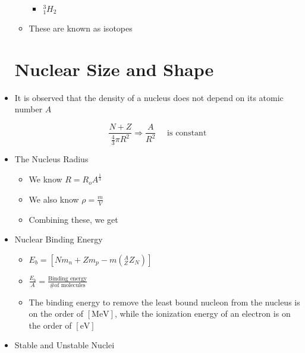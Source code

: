 \begin{itemize}
\begin{itemize}
\begin{itemize}
          \item $^3_1H_2$

        \end{itemize}

      \item These are known as isotopes

    \end{itemize}

    \section{Nuclear Size and Shape}

  \item It is observed that the density of a nucleus does not depend on its atomic number $A$

    $$\dfrac{N+Z}{\frac{4}{3}\pi R^2}\Rightarrow \frac{A}{R^2}\quad\text{ is constant}$$

  \item The Nucleus Radius

    \begin{itemize}

      \item We know $R=R_oA^{\frac{1}{3}}$

      \item We also know $\rho=\frac{m}{V}$

      \item Combining these, we get

    \end{itemize}

  \item Nuclear Binding Energy

    \begin{itemize}

      \item $E_{b}=\left[ Nm_n+Zm_p-m\left( ^A_ZZ_N \right) \right]$

      \item $\frac{E_b}{A}=\frac{\text{Binding energy}}{\text{\# of molecules}}$

      \item The binding energy to remove the least bound nucleon from the nucleus is on the order of $[\si{\mega\eV}]$, while the ionization energy of an electron is on the order of $[\si{\eV}]$

    \end{itemize}

  \item Stable and Unstable Nuclei


\end{itemize}
